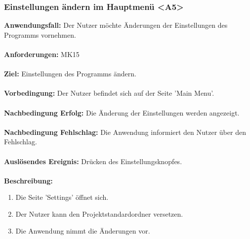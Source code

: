 \documentclass[parskip=full]{scrartcl} %
\begin{document}
\subsubsection*{Einstellungen ändern im Hauptmenü <A5>}
\textbf{Anwendungsfall:} Der Nutzer möchte Änderungen der Einstellungen des Programms vornehmen. \\\\
\textbf{Anforderungen:} MK15\\\\
\textbf{Ziel:} Einstellungen des Programms ändern.\\\\
\textbf{Vorbedingung:}  Der Nutzer befindet sich auf der Seite 'Main Menu'.  \\\\
\textbf{Nachbedingung Erfolg:} Die Änderung der Einstellungen werden angezeigt.\\\\
\textbf{Nachbedingung Fehlschlag:} Die Anwendung informiert den Nutzer über den Fehlschlag.\\\\
\textbf{Auslösendes Ereignis:} Drücken des Einstellungsknopfes. \\\\
\textbf{Beschreibung:}
\begin{enumerate}
    \item Die Seite 'Settings' öffnet sich.
    \item Der Nutzer kann den Projektstandardordner versetzen.
    \item Die Anwendung nimmt die Änderungen vor.
\end{enumerate}
\newpage
\end{document}
